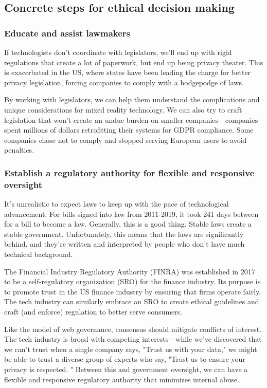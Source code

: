 \subsection{Concrete steps for ethical decision making}\label{sec:steps}
\subsubsection{Educate and assist lawmakers}
If technologists don't coordinate with legislators, we'll end up with rigid regulations that create a lot of paperwork, but end up being privacy theater. This is exacerbated in the US, where states have been leading the charge for better privacy legislation, forcing companies to comply with a hodgepodge of laws.

By working with legislators, we can help them understand the complications and unique considerations for mixed reality technology. We can also try to craft legislation that won't create an undue burden on smaller companies---companies spent millions of dollars retrofitting their systems for GDPR compliance. Some companies chose not to comply and stopped serving European users to avoid penalties.

\subsubsection{Establish a regulatory authority for flexible and responsive oversight}

It's unrealistic to expect laws to keep up with the pace of technological advancement. For bills signed into law from 2011-2019, it took 241 days between for a bill to become a law. Generally, this is a good thing. Stable laws create a stable government. Unfortunately, this means that the laws are significantly behind, and they're written and interpreted by people who don't have much technical background.

The Financial Industry Regulatory Authority (FINRA) was established in 2017 to be a self-regulatory organization (SRO) for the finance industry. Its purpose is to promote trust in the US finance industry by ensuring that firms operate fairly. The tech industry can similarly embrace an SRO to create ethical guidelines and craft (and enforce) regulation to better serve consumers\cite{reich}.

Like the model of web governance, consensus should mitigate conflicts of interest. The tech industry is broad with competing interests---while we've discovered that we can't trust when a single company says, "Trust us with your data," we might be able to trust a diverse group of experts who say, "Trust us to ensure your privacy is respected. " Between this and government oversight, we can have a flexible and responsive regulatory authority that minimizes internal abuse.


